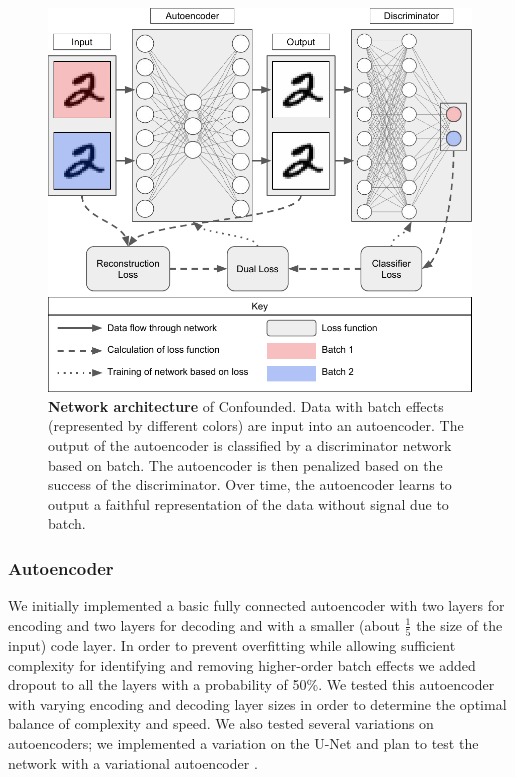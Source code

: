\documentclass[notitlepage]{article}
\begin{document}
\begin{figure}
	\centering
	\includegraphics[width=\columnwidth]{figures/final/network}
	\caption{\textbf{Network architecture} of Confounded.
	Data with batch effects (represented by different colors) are input into an autoencoder.
	The output of the autoencoder is classified by a discriminator network based on batch.
	The autoencoder is then penalized based on the success of the discriminator.
	Over time, the autoencoder learns to output a faithful representation of the data without signal due to batch.}
	\label{fig:network}
\end{figure}

\subsubsection{Autoencoder}

We initially implemented a basic fully connected autoencoder with two layers for encoding and two layers for decoding and with a smaller (about $\frac{1}{5}$ the size of the input) code layer.
In order to prevent overfitting while allowing sufficient complexity for identifying and removing higher-order batch effects we added dropout to all the layers with a probability of 50\%.
We tested this autoencoder with varying encoding and decoding layer sizes in order to determine the optimal balance of complexity and speed.
We also tested several variations on autoencoders; we implemented a variation on the U-Net \cite{ronneberger_u-net_2015} and plan to test the network with a variational autoencoder \cite{kingma_auto-encoding_2013}.
\end{document}
